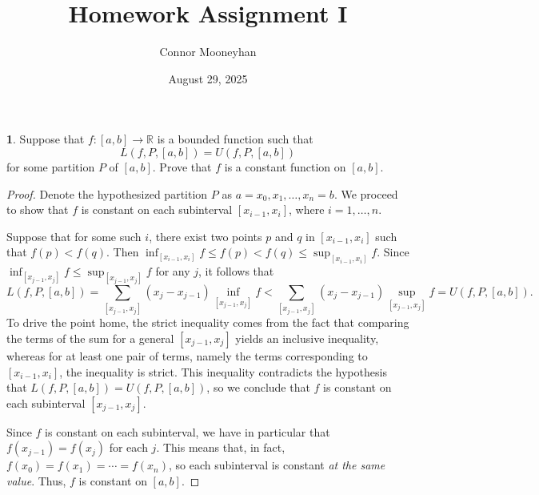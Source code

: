 \documentclass[12pt]{article}
\title{Homework Assignment I}
\author{Connor Mooneyhan}
\date{August 29, 2025}
\theoremstyle{definition}
\newtheorem{ex}{}
\begin{document}
\maketitle

\begin{ex}
	Suppose that $f: [a, b] \to \mathbb{R}$ is a bounded function such that \begin{equation*}
		L(f, P, [a, b]) = U(f, P, [a, b])
	\end{equation*}
	for some partition $P$ of $[a, b]$.
	Prove that $f$ is a constant function on $[a, b]$.
\end{ex}
\begin{proof}
	Denote the hypothesized partition $P$ as $a = x_0, x_1, \dots, x_n = b$.
	We proceed to show that $f$ is constant on each subinterval $[x_{i-1}, x_i]$, where $i = 1, \dots, n$.

	Suppose that for some such $i$, there exist two points $p$ and $q$ in $[x_{i-1}, x_i]$ such that $f(p) < f(q)$.
	Then $\inf_{[x_{i-1}, x_i]} f \leq f(p) < f(q) \leq \sup_{[x_{i-1}, x_i]} f$.
	Since $\inf_{[x_{j-1}, x_j]} f \leq \sup_{[x_{j-1}, x_j]} f$ for any $j$, it follows that \begin{equation*}
		L(f, P, [a, b]) = \sum_{[x_{j-1}, x_j]} (x_j - x_{j-1})\inf_{[x_{j-1}, x_j]} f < \sum_{[x_{j-1}, x_j]} (x_j - x_{j-1})\sup_{[x_{j-1}, x_j]} f = U(f, P, [a, b]).
	\end{equation*}
	To drive the point home, the strict inequality comes from the fact that comparing the terms of the sum for a general $[x_{j-1}, x_j]$ yields an inclusive inequality, whereas for at least one pair of terms, namely the terms corresponding to $[x_{i - 1}, x_i]$, the inequality is strict.
	This inequality contradicts the hypothesis that $L(f, P, [a, b]) = U(f, P, [a, b])$, so we conclude that $f$ is constant on each subinterval $[x_{j - 1}, x_j]$.

	Since $f$ is constant on each subinterval, we have in particular that $f(x_{j - 1}) = f(x_j)$ for each $j$. This means that, in fact, $f(x_0) = f(x_1) = \cdots = f(x_n)$, so each subinterval is constant \textit{at the same value}. Thus, $f$ is constant on $[a, b]$.
\end{proof}
\end{document}
